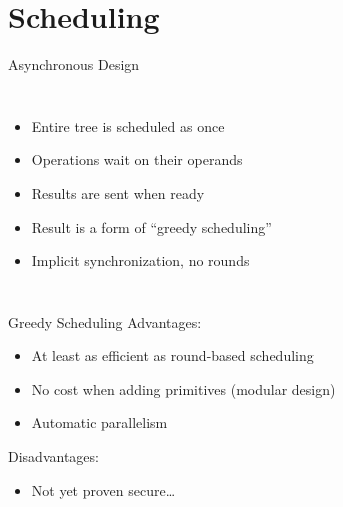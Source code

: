 \documentclass[t,noamsthm]{beamer}
\newcommand{\py}[1]{\lstinline|#1|}
\begin{document}
\section{Scheduling}

\begin{frame}{Asynchronous Design}

  \begin{columns}




    \begin{itemize}
    \item Entire tree is scheduled as once
    \item Operations wait on their operands
    \item Results are sent when ready
    \item Result is a form of ``greedy scheduling''
    \item Implicit synchronization, no rounds
    \end{itemize}

  \end{columns}

\end{frame}

\begin{frame}{Greedy Scheduling}
  Advantages:
  \begin{itemize}
  \item At least as efficient as round-based scheduling
  \item No cost when adding primitives (modular design)
  \item Automatic parallelism
  \end{itemize}

  Disadvantages:
  \begin{itemize}
  \item Not yet proven secure\dots
  \end{itemize}
\end{frame}
\end{document}
